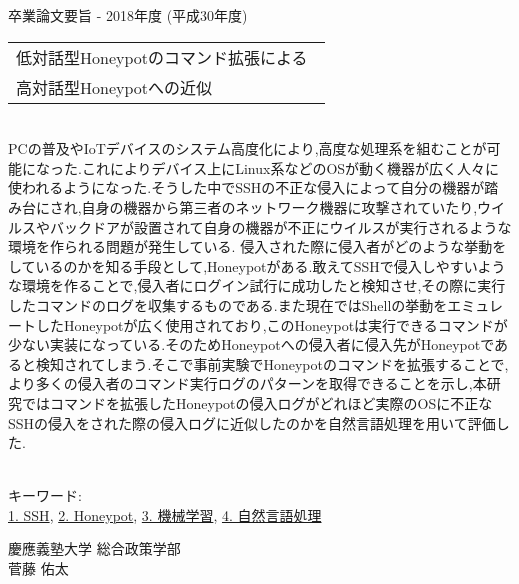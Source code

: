 卒業論文要旨 - 2018年度 (平成30年度)
\begin{center}
\begin{large}
\begin{tabular}{|M{0.97\linewidth}|}
    \hline
   低対話型Honeypotのコマンド拡張による\\高対話型Honeypotへの近似\\
    \hline
\end{tabular}
\end{large}
\end{center}

~ \\

PCの普及やIoTデバイスのシステム高度化により,高度な処理系を組むことが可能になった.これによりデバイス上にLinux系などのOSが動く機器が広く人々に使われるようになった.そうした中でSSHの不正な侵入によって自分の機器が踏み台にされ,自身の機器から第三者のネットワーク機器に攻撃されていたり,ウイルスやバックドアが設置されて自身の機器が不正にウイルスが実行されるような環境を作られる問題が発生している.
侵入された際に侵入者がどのような挙動をしているのかを知る手段として,Honeypotがある.敢えてSSHで侵入しやすいような環境を作ることで,侵入者にログイン試行に成功したと検知させ,その際に実行したコマンドのログを収集するものである.また現在ではShellの挙動をエミュレートしたHoneypotが広く使用されており,このHoneypotは実行できるコマンドが少ない実装になっている.そのためHoneypotへの侵入者に侵入先がHoneypotであると検知されてしまう.そこで事前実験でHoneypotのコマンドを拡張することで,より多くの侵入者のコマンド実行ログのパターンを取得できることを示し,本研究ではコマンドを拡張したHoneypotの侵入ログがどれほど実際のOSに不正なSSHの侵入をされた際の侵入ログに近似したのかを自然言語処理を用いて評価した.


~ \\
キーワード:\\
\underline{1. SSH},
\underline{2. Honeypot},
\underline{3. 機械学習},
\underline{4. 自然言語処理}
\begin{flushright}
慶應義塾大学 総合政策学部\\
菅藤 佑太
\end{flushright}
